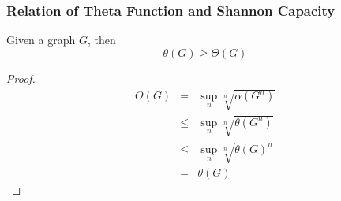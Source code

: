       \begin{frame}
            \frametitle{Relation of Theta Function and Shannon Capacity}

            \begin{theorem}
                  Given a graph $ G $, then
                  \begin{equation}
                        \theta(G) \geq \Theta(G)
                  \end{equation}
            \end{theorem}

            \pause

            \begin{proof}
                  \begin{eqnarray}
                        \Theta(G) &=& \sup_{n} \sqrt[n]{\alpha(G^{n})} \\
                        &\leq& \sup_{n} \sqrt[n]{\theta(G^{n})} \\
                        &\leq& \sup_{n} \sqrt[n]{\theta(G)^{n}} \\
                        &=& \theta(G)
                  \end{eqnarray}
            \end{proof}
      \end{frame}